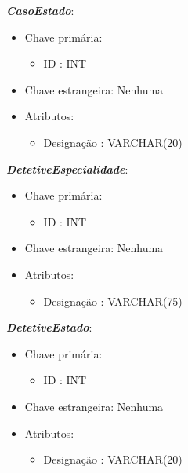 \documentclass[a4paper,12pt]{scrreprt}
\begin{document}
        \vspace{0.5cm}
        
        \textbf{\textit{CasoEstado}}:
        \begin{itemize}
            \item Chave primária:
                \begin{itemize}
                    \item ID : INT
                \end{itemize}
            \item Chave estrangeira: Nenhuma
            \item Atributos:
                \begin{itemize}
                    \item Designação : VARCHAR(20)
                \end{itemize}
        \end{itemize}

        \vspace{0.5cm}
        
        \textbf{\textit{DetetiveEspecialidade}}:
        \begin{itemize}
            \item Chave primária:
                \begin{itemize}
                    \item ID : INT
                \end{itemize}
            \item Chave estrangeira: Nenhuma
            \item Atributos:
                \begin{itemize}
                    \item Designação : VARCHAR(75)
                \end{itemize}
        \end{itemize}

        \clearpage
        
        \textbf{\textit{DetetiveEstado}}:
        \begin{itemize}
            \item Chave primária:
                \begin{itemize}
                    \item ID : INT
                \end{itemize}
            \item Chave estrangeira: Nenhuma
            \item Atributos:
                \begin{itemize}
                    \item Designação : VARCHAR(20)
                \end{itemize}
        \end{itemize}
\end{document}
